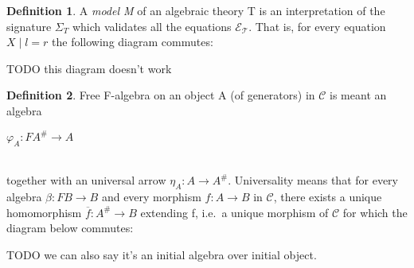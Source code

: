 \documentclass[declaration,shortabstract]{iithesis}
\theoremstyle{definition} \newtheorem{definition}{Definition}[chapter]
\theoremstyle{remark} \newtheorem{remark}[definition]{Observation}
\theoremstyle{plain} \newtheorem{theorem}[definition]{Theorem}
\theoremstyle{plain} \newtheorem{lemma}[definition]{Lemma}
\begin{document}
    \begin{definition}

    A \textit{model M} of an algebraic theory T is an interpretation of the
    signature ${\Sigma_{T}}$ which validates all the equations $\mathcal{E_{T}}$.
    That is, for every equation $X \mid l = r$ the following diagram commutes:

    \begin{center}
    \end{center}

    TODO this diagram doesn't work

    \begin{center}
    \end{center}

    \end{definition}


    \begin{definition}

    Free F-algebra on an object A (of generators) in $\mathcal{C}$ is meant an algebra

    \begin{center}

    $ \varphi_{A} : F A^{\#} \longrightarrow A $

    \end{center}
    \\
    together with an universal arrow $ \eta_{A} : A \longrightarrow A^{\#} $.
    Universality means that for every algebra $ \beta : F B \longrightarrow B $
    and every morphism $ f : A \longrightarrow B $ in $ \mathcal{C}$, there
    exists a unique homomorphism $ \overline{f} : A^{\#} \longrightarrow B $
    extending f, i.e.\ a unique morphism of $ \mathcal{C}$ for which the diagram
    below commutes:

    TODO we can also say it's an initial algebra over initial object.

    \begin{center}
    \begin{tikzcd}[row sep=huge, column sep=large]
    \end{tikzcd}
    \end{center}

    \end{definition}
\end{document}
